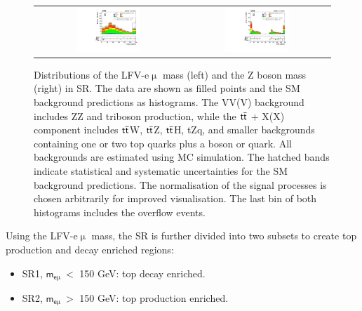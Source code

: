 \begin{figure}[tbh!]
 \begin{center}
 \begin{tabular}{cc}
 \includegraphics[width=0.45\textwidth]{figures/Part3/Selection/Memu}&
 \includegraphics[width=0.45\textwidth]{figures/Part3/Selection/Zmass} \\
 \end{tabular}
 \caption{Distributions of the LFV-e$\upmu$ mass (left) and the Z boson mass (right) in \ac{SR}. The data are shown as filled points and the \ac{SM} background predictions as histograms. The VV(V) background includes ZZ and triboson production, while the $\textsf{t}\overline{\textsf{t}}$ + X(X) component includes $\textsf{t}\overline{\textsf{t}}$W, $\textsf{t}\overline{\textsf{t}}$Z, $\textsf{t}\overline{\textsf{t}}$H, tZq, and smaller backgrounds containing one or two top quarks plus a boson or quark. All backgrounds are estimated using \ac{MC} simulation. The hatched bands indicate statistical and systematic uncertainties for the \ac{SM} background predictions. The normalisation of the signal processes is chosen arbitrarily for improved visualisation. The last bin of both histograms includes the overflow events.}
 \label{fig:SR}
 \end{center}
\end{figure}

Using the LFV-e$\upmu$ mass, the \ac{SR} is further divided into two subsets to create top production and decay enriched regions:

\begin{itemize}
\item SR1, $\textsf{m}_{\textsf{e}\upmu}~<$ 150 GeV: top decay enriched.
\item SR2, $\textsf{m}_{\textsf{e}\upmu}~>$ 150 GeV: top production enriched.
\end{itemize}
